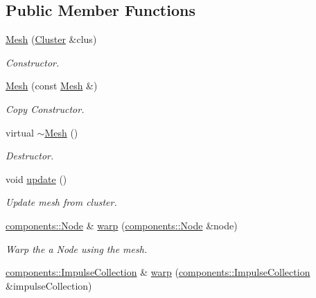 \subsection*{\-Public \-Member \-Functions}
\begin{DoxyCompactItemize}
\item 
\hyperlink{classcryomesh_1_1structures_1_1Mesh_abdc3f0f1976c80f177c2ed5ca05f87c4}{\-Mesh} (\hyperlink{classcryomesh_1_1structures_1_1Cluster}{\-Cluster} \&clus)
\begin{DoxyCompactList}\small\item\em \-Constructor. \end{DoxyCompactList}\item 
\hyperlink{classcryomesh_1_1structures_1_1Mesh_ac017c9919ddc6e43eaae4bfc41482494}{\-Mesh} (const \hyperlink{classcryomesh_1_1structures_1_1Mesh}{\-Mesh} \&)
\begin{DoxyCompactList}\small\item\em \-Copy \-Constructor. \end{DoxyCompactList}\item 
virtual \hyperlink{classcryomesh_1_1structures_1_1Mesh_aef373539eb9566c327ec33adb21dc631}{$\sim$\-Mesh} ()
\begin{DoxyCompactList}\small\item\em \-Destructor. \end{DoxyCompactList}\item 
void \hyperlink{classcryomesh_1_1structures_1_1Mesh_ab21a332badd5ccc36bc0f7d2ade2560b}{update} ()
\begin{DoxyCompactList}\small\item\em \-Update mesh from cluster. \end{DoxyCompactList}\item 
\hyperlink{classcryomesh_1_1components_1_1Node}{components\-::\-Node} \& \hyperlink{classcryomesh_1_1structures_1_1Mesh_a9e8d644176a116f998e7d2b904427564}{warp} (\hyperlink{classcryomesh_1_1components_1_1Node}{components\-::\-Node} \&node)
\begin{DoxyCompactList}\small\item\em \-Warp the a \-Node using the mesh. \end{DoxyCompactList}\item 
\hyperlink{classcryomesh_1_1components_1_1ImpulseCollection}{components\-::\-Impulse\-Collection} \& \hyperlink{classcryomesh_1_1structures_1_1Mesh_a0dba481a327d8353b2c17f6174a750fe}{warp} (\hyperlink{classcryomesh_1_1components_1_1ImpulseCollection}{components\-::\-Impulse\-Collection} \&impulse\-Collection)

\end{DoxyCompactItemize}
